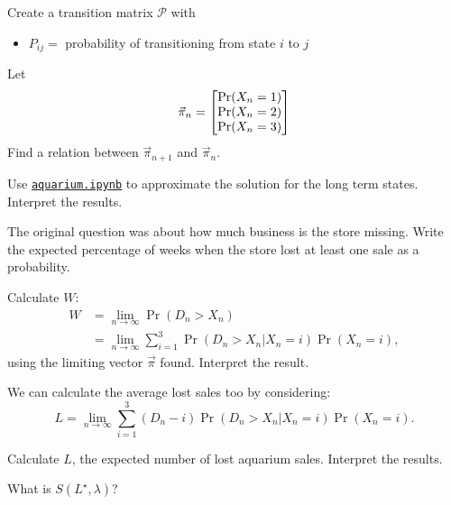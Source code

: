 \begin{slide}

\begin{parts}
\setcounter{partsitem}{5}
	\item Create a transition matrix $\mathcal{P}$ with
	\begin{itemize}
		\item $P_{ij} = $ probability of transitioning from state $i$ to $j$
	\end{itemize}
	
	\item Let 
	\[ 
	\vec{\pi}_n = \mat{ 	\Pr(X_n = 1) \\
					\Pr(X_n = 2) \\
					\Pr(X_n = 3) }
	\]
	Find a relation between $\vec{\pi}_{n+1}$ and $\vec{\pi}_n$.
	
	\item Use \href{https://utoronto.syzygy.ca/jupyter/user-redirect/git-pull?repo=https://github.com/bigfatbernie/IBLMathModeling&subPath=book/python/aquarium.ipynb}{\tt aquarium.ipynb} to approximate the solution for the long term states. 
		Interpret the results.

	\item The original question was about how much business is the store missing. Write the expected percentage of weeks when the store lost at least one sale as a probability.
	
	\item Calculate $W$:
	\begin{align*}
	W 	& = \lim_{n \to \infty} \Pr(D_n > X_n) \\
		& = \lim_{n \to \infty} \sum_{i=1}^3 \Pr(D_n>X_n | X_n = i) \Pr (X_n = i),
	\end{align*}
	using the limiting vector $\vec{\pi}$ found. Interpret the result.
	
	\item We can calculate the average lost sales too by considering:
	\[
	L	= \lim_{n \to \infty} \sum_{i=1}^3 (D_n - i) \Pr(D_n>X_n | X_n = i) \Pr (X_n = i).
	\]
	
	Calculate $L$, the expected number of lost aquarium sales. Interpret the results.
	
	\item What is $S(L^\star, \lambda)$?
\end{parts}

	
\end{slide}




